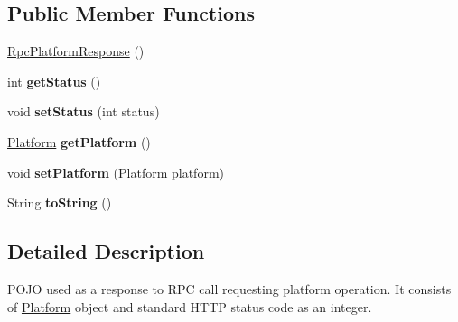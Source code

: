 \subsection*{Public Member Functions}
\begin{DoxyCompactItemize}
\item 
\hyperlink{classeu_1_1h2020_1_1symbiote_1_1model_1_1RpcPlatformResponse_a6df0d5ad3e1f87fa68c00154c6b7eecb}{Rpc\+Platform\+Response} ()
\item 
int {\bfseries get\+Status} ()\hypertarget{classeu_1_1h2020_1_1symbiote_1_1model_1_1RpcPlatformResponse_a2b41294e25b3294f164c1387192011ec}{}\label{classeu_1_1h2020_1_1symbiote_1_1model_1_1RpcPlatformResponse_a2b41294e25b3294f164c1387192011ec}

\item 
void {\bfseries set\+Status} (int status)\hypertarget{classeu_1_1h2020_1_1symbiote_1_1model_1_1RpcPlatformResponse_ade90e8ef58f15f704ca815895826e468}{}\label{classeu_1_1h2020_1_1symbiote_1_1model_1_1RpcPlatformResponse_ade90e8ef58f15f704ca815895826e468}

\item 
\hyperlink{classeu_1_1h2020_1_1symbiote_1_1model_1_1Platform}{Platform} {\bfseries get\+Platform} ()\hypertarget{classeu_1_1h2020_1_1symbiote_1_1model_1_1RpcPlatformResponse_a52977e40eb98dedd2c2cf93033159a98}{}\label{classeu_1_1h2020_1_1symbiote_1_1model_1_1RpcPlatformResponse_a52977e40eb98dedd2c2cf93033159a98}

\item 
void {\bfseries set\+Platform} (\hyperlink{classeu_1_1h2020_1_1symbiote_1_1model_1_1Platform}{Platform} platform)\hypertarget{classeu_1_1h2020_1_1symbiote_1_1model_1_1RpcPlatformResponse_a00dfb59a3d775deb559bcb918fe37ef4}{}\label{classeu_1_1h2020_1_1symbiote_1_1model_1_1RpcPlatformResponse_a00dfb59a3d775deb559bcb918fe37ef4}

\item 
String {\bfseries to\+String} ()\hypertarget{classeu_1_1h2020_1_1symbiote_1_1model_1_1RpcPlatformResponse_aedd6526f0a148f79b9e120a21a87b96b}{}\label{classeu_1_1h2020_1_1symbiote_1_1model_1_1RpcPlatformResponse_aedd6526f0a148f79b9e120a21a87b96b}

\end{DoxyCompactItemize}


\subsection{Detailed Description}
P\+O\+JO used as a response to R\+PC call requesting platform operation. It consists of \hyperlink{classeu_1_1h2020_1_1symbiote_1_1model_1_1Platform}{Platform} object and standard H\+T\+TP status code as an integer. 

